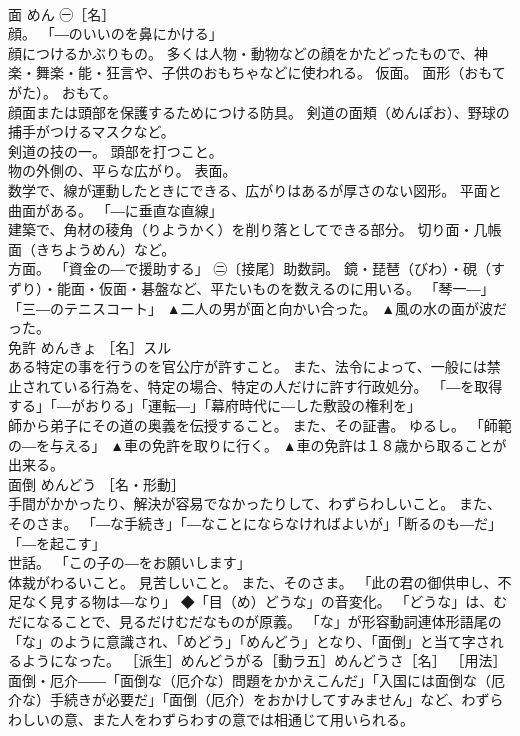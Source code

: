 \documentclass[8pt]{extreport}
\begin{document}
\begin{CJK}{UTF8}{min}
\\	面	めん	㊀［名］ 
\\	顔。 「―のいいのを鼻にかける」 
\\	顔につけるかぶりもの。 多くは人物・動物などの顔をかたどったもので、神楽・舞楽・能・狂言や、子供のおもちゃなどに使われる。 仮面。 面形（おもてがた）。 おもて。 
\\	顔面または頭部を保護するためにつける防具。 剣道の面頬（めんぽお）、野球の捕手がつけるマスクなど。 
\\	剣道の技の一。 頭部を打つこと。 
\\	物の外側の、平らな広がり。 表面。 
\\	数学で、線が運動したときにできる、広がりはあるが厚さのない図形。 平面と曲面がある。 「―に垂直な直線」 
\\	建築で、角材の稜角（りようかく）を削り落としてできる部分。 切り面・几帳面（きちようめん）など。 
\\	方面。 「資金の―で援助する」 ㊁〔接尾〕助数詞。 鏡・琵琶（びわ）・硯（すずり）・能面・仮面・碁盤など、平たいものを数えるのに用いる。 「琴一―」「三―のテニスコート」	▲二人の男が面と向かい合った。 ▲風の水の面が波だった。
\\	免許	めんきょ	［名］スル 
\\	ある特定の事を行うのを官公庁が許すこと。 また、法令によって、一般には禁止されている行為を、特定の場合、特定の人だけに許す行政処分。 「―を取得する」「―がおりる」「運転―」「幕府時代に―した敷設の権利を」 
\\	師から弟子にその道の奥義を伝授すること。 また、その証書。 ゆるし。 「師範の―を与える」	▲車の免許を取りに行く。 ▲車の免許は１８歳から取ることが出来る。
\\	面倒	めんどう	［名・形動］ 
\\	手間がかかったり、解決が容易でなかったりして、わずらわしいこと。 また、そのさま。 「―な手続き」「―なことにならなければよいが」「断るのも―だ」「―を起こす」 
\\	世話。 「この子の―をお願いします」 
\\	体裁がわるいこと。 見苦しいこと。 また、そのさま。 「此の君の御供申し、不足なく見する物は―なり」 ◆「目（め）どうな」の音変化。 「どうな」は、むだになることで、見るだけむだなものが原義。 「な」が形容動詞連体形語尾の「な」のように意識され、「めどう」「めんどう」となり、「面倒」と当て字されるようになった。 ［派生］めんどうがる［動ラ五］めんどうさ［名］ ［用法］面倒・厄介――「面倒な（厄介な）問題をかかえこんだ」「入国には面倒な（厄介な）手続きが必要だ」「面倒（厄介）をおかけしてすみません」など、わずらわしいの意、また人をわずらわすの意では相通じて用いられる。 

\end{CJK}
\end{document}
